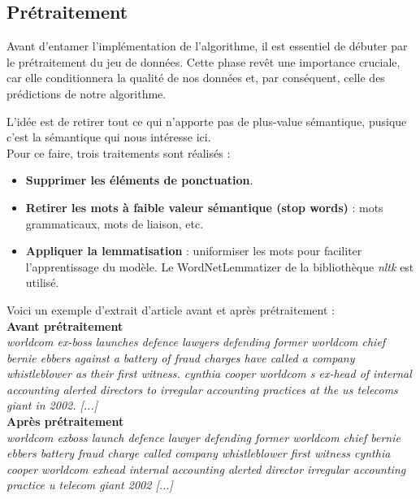 \documentclass[a4paper,12pt]{article}
\begin{document}
\subsection{Prétraitement}

Avant d'entamer l'implémentation de l'algorithme, il est essentiel de débuter par le prétraitement du jeu de données. Cette phase revêt une importance cruciale, car elle conditionnera la qualité de nos données et, par conséquent, celle des prédictions de notre algorithme.

L'idée est de retirer tout ce qui n'apporte pas de plus-value sémantique, pusique c'est la sémantique qui nous intéresse ici.\\

Pour ce faire, trois traitements sont réalisés : 
\begin{itemize}
    \item \textbf{Supprimer les éléments de ponctuation}.
    \item \textbf{Retirer les mots à faible valeur sémantique (stop words)} : mots grammaticaux, mots de liaison, etc.
    \item \textbf{Appliquer la lemmatisation} : uniformiser les mots pour faciliter l'apprentissage du modèle. Le WordNetLemmatizer de la bibliothèque \textit{nltk} \cite{nltk} est utilisé.
\end{itemize}

Voici un exemple d'extrait d'article avant et après prétraitement :\\

\textbf{Avant prétraitement}\\

\textit{worldcom ex-boss launches defence lawyers defending former worldcom chief bernie ebbers against a battery of fraud charges have called a company whistleblower as their first witness.  cynthia cooper  worldcom s ex-head of internal accounting  alerted directors to irregular accounting practices at the us telecoms giant in 2002. [...]}\\

\textbf{Après prétraitement}\\

\textit{worldcom exboss launch defence lawyer defending former worldcom chief bernie ebbers battery fraud charge called company whistleblower first witness cynthia cooper worldcom exhead internal accounting alerted director irregular accounting practice u telecom giant 2002 [...]}\\
\end{document}
